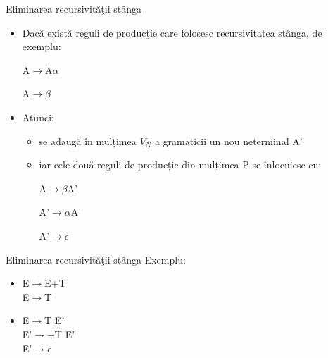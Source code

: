 \documentclass[pdf]{beamer}
\begin{document}
\begin{frame}{Eliminarea recursivităţii stânga}
\begin{itemize}

\item
Dacă există reguli de producţie care folosesc recursivitatea stânga, de exemplu: 

A$\rightarrow$A$\alpha$

A$\rightarrow\beta$

\item
Atunci: 

\begin{itemize}
\item
se adaugă în mulțimea $V_N$ a gramaticii un nou neterminal A’
\item
iar cele două reguli de producție din mulțimea P se înlocuiesc cu:

A$\rightarrow\beta$A'

A'$\rightarrow\alpha$A'

A'$\rightarrow\epsilon$
\end{itemize}
\end{itemize}
\end{frame}



\begin{frame}{Eliminarea recursivităţii stânga}
Exemplu:

\begin{itemize}
\item
E$\rightarrow$E+T\\
E$\rightarrow$T\\

\item
E$\rightarrow$T E'\\
E'$\rightarrow$+T E'\\
E'$\rightarrow\epsilon$\\
\end{itemize}
\end{frame}
\end{document}
